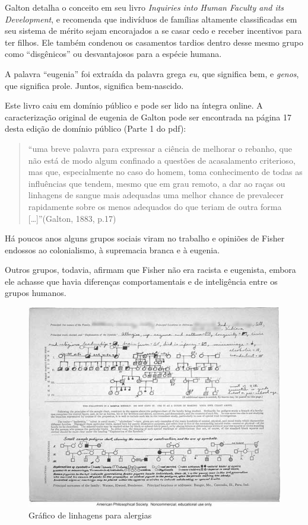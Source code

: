 \documentclass[
]{book}
\begin{document}
Galton detalha o conceito em seu livro \emph{Inquiries into Human Faculty and its Development}, e recomenda que indivíduos de famílias altamente classificadas em seu sistema de mérito sejam encorajados a se casar cedo e receber incentivos para ter filhos. Ele também condenou os casamentos tardios dentro desse mesmo grupo como ``disgênicos'' ou desvantajosos para a espécie humana.

A palavra ``eugenia'' foi extraída da palavra grega \emph{eu}, que significa bem, e \emph{genos}, que significa prole. Juntos, significa bem-nascido.

Este livro caiu em domínio público e pode ser lido na íntegra online. A caracterização original de eugenia de Galton pode ser encontrada na página 17 desta edição de domínio público (Parte 1 do pdf):

\hfill\break

\begin{quote}
``uma breve palavra para expressar a ciência de melhorar o rebanho, que não está de modo algum confinado a questões de acasalamento criterioso, mas que, especialmente no caso do homem, toma conhecimento de todas as influências que tendem, mesmo que em grau remoto, a dar ao raças ou linhagens de sangue mais adequadas uma melhor chance de prevalecer rapidamente sobre os menos adequados do que teriam de outra forma {[}\ldots{]}''(Galton, 1883, p.17)
\end{quote}

\hfill\break

Há poucos anos alguns grupos sociais viram no trabalho e opiniões de Fisher endossos ao colonialismo, à supremacia branca e à eugenia.

Outros grupos, todavia, afirmam que Fisher não era racista e eugenista, embora ele achasse que havia diferenças comportamentais e de inteligência entre os grupos humanos.

\hfill\break

\begin{figure}

{\centering \includegraphics[width=0.75\linewidth]{images1/chart_pedigree_allergy2} 

}

\caption{Gráfico de linhagens para alergias}\label{fig:unnamed-chunk-16}
\end{figure}
\end{document}
